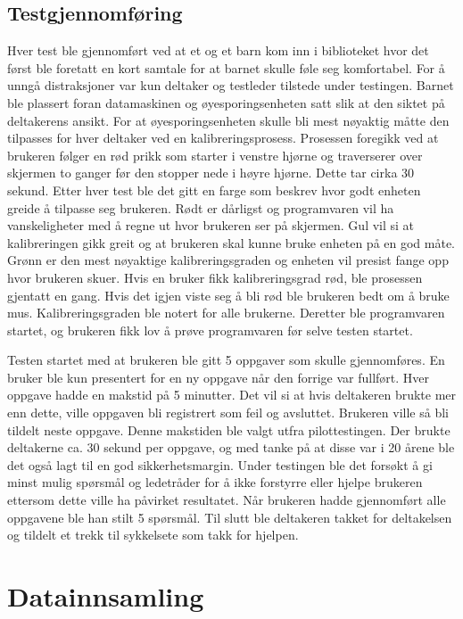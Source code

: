 \subsection{Testgjennomføring} 
Hver test ble gjennomført ved at et og et barn kom inn i biblioteket hvor det først ble foretatt en kort 
samtale for at barnet skulle føle seg komfortabel. For å unngå distraksjoner var kun deltaker og testleder 
tilstede under testingen. Barnet ble plassert foran datamaskinen og øyesporingsenheten satt slik at den siktet på deltakerens ansikt. For at øyesporingsenheten skulle bli mest nøyaktig måtte den tilpasses for hver deltaker ved en kalibreringsprosess. Prosessen foregikk ved at brukeren følger en rød prikk som starter i 
venstre hjørne og traverserer over skjermen to ganger før den stopper nede i høyre hjørne. Dette 
tar cirka 30 sekund. Etter hver test ble det gitt en farge som beskrev hvor godt enheten greide å 
tilpasse seg brukeren. Rødt er dårligst og programvaren vil ha vanskeligheter med å regne ut hvor 
brukeren ser på skjermen. Gul vil si at kalibreringen gikk greit og at brukeren skal kunne bruke 
enheten på en god måte. Grønn er den mest nøyaktige kalibreringsgraden og enheten vil presist 
fange opp hvor brukeren skuer. Hvis en bruker fikk kalibreringsgrad rød, ble prosessen gjentatt en 
gang. Hvis det igjen viste seg å bli rød ble brukeren bedt om å bruke mus. Kalibreringsgraden ble 
notert for alle brukerne. Deretter ble programvaren startet, og brukeren fikk lov å prøve programvaren før selve testen startet. 
 
 
Testen startet med at brukeren ble  gitt 5 oppgaver som skulle gjennomføres. En bruker ble kun presentert for en ny oppgave når den forrige var fullført. Hver oppgave hadde en makstid på 5 minutter. Det vil si at hvis deltakeren brukte mer enn dette, ville oppgaven bli registrert som feil og avsluttet. Brukeren ville så bli tildelt neste oppgave. Denne makstiden ble valgt utfra pilottestingen. Der brukte deltakerne ca. 30 sekund per oppgave, og med tanke på at disse var i 20 årene ble det også lagt til en god sikkerhetsmargin. Under testingen ble det forsøkt å gi minst mulig spørsmål og ledetråder for å ikke forstyrre eller hjelpe brukeren ettersom dette ville ha påvirket resultatet. Når brukeren hadde gjennomført alle oppgavene ble han stilt 5 spørsmål. Til slutt ble deltakeren takket for deltakelsen og tildelt et trekk til sykkelsete som takk for hjelpen. 
 
 
\section{Datainnsamling} 
 
